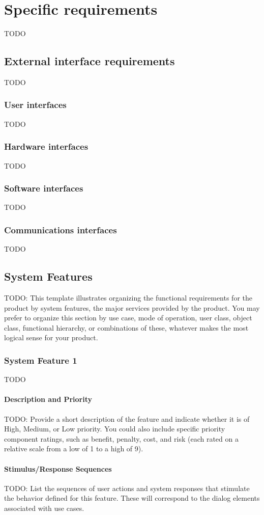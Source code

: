 \section{Specific requirements}
TODO
\subsection{External interface requirements}
TODO
\subsubsection{User interfaces}
TODO
\subsubsection{Hardware interfaces}
TODO
\subsubsection{Software interfaces}
TODO
\subsubsection{Communications interfaces}
TODO
\subsection{System Features}
TODO: This template illustrates organizing the functional requirements for the product by system features, the major services provided by the product. You may prefer to organize this section by use case, mode of operation, user class, object class, functional hierarchy, or combinations of these, whatever makes the most logical sense for your product.
\subsubsection{System Feature 1}
TODO
\paragraph{Description and Priority}
TODO: Provide a short description of the feature and indicate whether it is of High, Medium, or Low priority. You could also include specific priority component ratings, such as benefit, penalty, cost, and risk (each rated on a relative scale from a low of 1 to a high of 9).
\paragraph{Stimulus/Response Sequences}
TODO: List the sequences of user actions and system responses that stimulate the behavior defined for this feature. These will correspond to the dialog elements associated with use cases.
